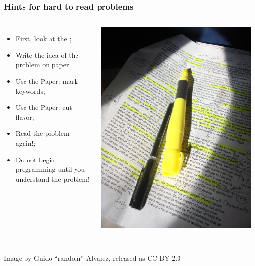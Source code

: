 \begin{frame}
  \frametitle{Hints for hard to read problems}

  \begin{columns}
    {\small
    \begin{itemize}
    \item First, look at the ;
    \item Write the idea of the problem on paper
    \item Use the Paper: mark keywords;
    \item Use the Paper: cut flavor;
    \item \alert{Read the problem again!};
    \item \alert{Do not begin programming until you understand the problem!}
    \end{itemize}
    }
    \includegraphics[width=\textwidth]{../img/textmarker}
  \end{columns}

  \vfill

  \hrulefill\\
  \hfill {\tiny Image by Guido ``random'' Alvarez, released as CC-BY-2.0}

\end{frame}


